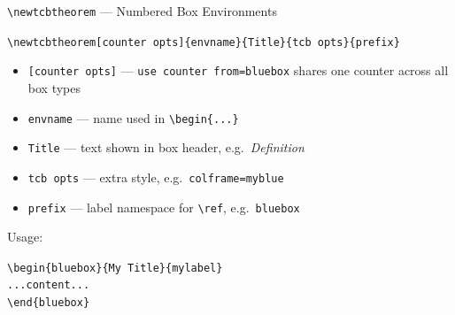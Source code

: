 \blueheader
\begin{frame}{\texttt{\textbackslash newtcbtheorem} --- Numbered Box Environments}
\begin{bluefocus}
\small\texttt{\textbackslash newtcbtheorem[counter opts]\{envname\}\{Title\}\{tcb opts\}\{prefix\}}
\end{bluefocus}
\begin{itemize}
  \item \texttt{[counter opts]} --- \texttt{use counter from=bluebox} shares one counter across all box types
  \item \texttt{envname} --- name used in \texttt{\textbackslash begin\{...\}}
  \item \texttt{Title} --- text shown in box header, e.g.\ \emph{Definition}
  \item \texttt{tcb opts} --- extra style, e.g.\ \texttt{colframe=myblue}
  \item \texttt{prefix} --- label namespace for \texttt{\textbackslash ref}, e.g.\ \texttt{bluebox}
\end{itemize}
\medskip
Usage:
\begin{bluefocus}
\small\texttt{\textbackslash begin\{bluebox\}\{My Title\}\{mylabel\}}\\
\texttt{\quad ...content...}\\
\texttt{\textbackslash end\{bluebox\}}
\end{bluefocus}
\end{frame}

